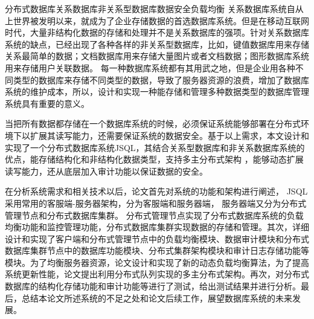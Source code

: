 
\begin{Cabstract}{分布式数据库}{关系数据库}{非关系型数据库}{数据安全}{负载均衡}
关系数据库系统自从上世界被发明以来，就成为了企业存储数据的首选数据库系统。但是在移动互联网时代，大量非结构化数据的存储和处理并不是关系数据库的强项。针对关系数据库系统的缺点，已经出现了各种各样的非关系型数据库，比如，键值数据库用来存储关系最简单的数据；文档数据库用来存储大量图片或者文档数据；图形数据库系统用来存储用户关联数据。
每一种数据库系统都有其用武之地，但是企业用各种不同类型的数据库来存储不同类型的数据，导致了服务器资源的浪费，增加了数据库系统的维护成本，所以，设计和实现一种能存储和管理多种数据类型的数据库管理系统具有重要的意义。

当把所有数据都存储在一个数据库系统的时候，必须保证系统能够部署在分布式环境下以扩展其读写能力，还需要保证系统的数据安全。基于以上需求，本文设计和实现了一个分布式数据库系统JSQL，其结合关系型数据库和非关系数据库系统的优点，能存储结构化和非结构化数据类型，支持多主分布式架构 ，能够动态扩展读写能力，还从底层加入审计功能以保证数据的安全。

在分析系统需求和相关技术以后，论文首先对系统的功能和架构进行阐述，
JSQL采用常用的客服端-服务器架构，分为客服端和服务器端，
服务器端又分为分布式管理节点和分布式数据库集群。
分布式管理节点实现了分布式数据库系统的负载均衡功能和监控管理功能，分布式数据库集群实现数据的存储和管理。其次，详细设计和实现了客户端和分布式管理节点中的负载均衡模块、数据审计模块和分布式数据库集群节点中的数据库功能模块、分布式集群架构模块和审计日志存储功能等模块。为了均衡服务器资源，论文设计和实现了新的动态负载均衡算法，为了提高系统更新性能，论文提出利用分布式队列实现的多主分布式架构。再次，对分布式数据库的结构化存储功能和审计功能等进行了测试，给出测试结果并进行分析。最后，总结本论文所述系统的不足之处和论文后续工作，展望数据库系统的未来发展。
\end{Cabstract}